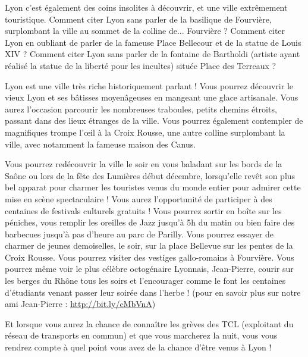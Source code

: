 Lyon c'est également des coins insolites à découvrir, et une ville extrêmement
touristique. Comment citer Lyon sans parler de la basilique de Fourvière,
surplombant la ville au sommet de la colline de... Fourvière ? Comment citer
Lyon en oubliant de parler de la fameuse Place Bellecour et de la statue de
Louis XIV ? Comment citer Lyon sans parler de la fontaine de Bartholdi (artiste
ayant réalisé la statue de la liberté pour les incultes) située
Place des Terreaux ?

Lyon est une ville très riche historiquement parlant ! Vous pourrez découvrir le
vieux Lyon et ses bâtisses moyenâgeuses en mangeant une glace artisanale. Vous
aurez l'occasion parcourir les nombreuses traboules, petits chemins étroits, passant dans
des lieux étranges de la ville. Vous
pourrez également contempler de magnifiques trompe l'œil à la Croix Rousse, une
autre colline surplombant la ville, avec notamment la fameuse maison des Canus.


Vous pourrez redécouvrir la ville le soir en vous
baladant sur les bords de la Saône ou lors de la fête des Lumières début décembre,
lorsqu'elle revêt son plus bel apparat pour charmer les touristes
venus du monde entier pour admirer cette mise en scène spectaculaire !
Vous aurez l'opportunité de participer à des centaines de festivals culturels gratuits
! Vous pourrez sortir en boîte sur les péniches, vous remplir les
oreilles de Jazz jusqu'à 5h du matin ou bien faire des barbecues
jusqu'à pas d'heure au parc de Parilly. Vous pourrez essayer de
charmer de jeunes demoiselles, le soir, sur la place Bellevue sur les
pentes de la Croix Rousse. Vous pourrez visiter des vestiges gallo-romains
à Fourvière. Vous pourrez même voir le plus célèbre octogénaire
Lyonnais, Jean-Pierre, courir sur les berges du Rhône tous les soirs et
l'encourager comme le font les centaines d'étudiants venant passer leur
soirée dans l'herbe ! (pour en savoir plus sur notre ami Jean-Pierre : \url{http://bit.ly/cMbVnA})

Et lorsque vous aurez la chance de connaître les grèves des TCL (exploitant du
réseau de transports en commun) et que vous marcherez la nuit, vous vous
rendrez compte à quel point vous avez de la chance d'être venus à Lyon !

